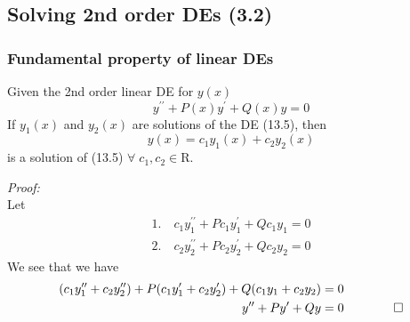 \documentclass{report}
\begin{document}
\subsection{Solving 2nd order DEs (3.2)}
\subsubsection{Fundamental property of linear DEs}
Given the 2nd order linear DE for $y(x)$
\begin{equation}
y^{\prime\prime} + P(x)y^\prime + Q(x)y = 0
\end{equation}
If $y_1(x)$ and $y_2(x)$ are solutions of the DE (13.5), then
$$y(x) = c_1y_1(x) + c_2y_2(x)$$
is a solution of (13.5) $\forall \; c_1,c_2 \in \mathrm{R}$.

\vspace{0.5em}\noindent\textit{Proof:} \\
Let
\begin{align*}
1. \quad c_1y_1^{\prime\prime} + Pc_1y_1^\prime + Qc_1y_1 = 0 \\
2. \quad c_2y_2^{\prime\prime} + Pc_2y_2^\prime + Qc_2y_2 = 0
\end{align*}
We see that we have
\begin{align*}
(c_1y_1^{\prime\prime} + c_2y_2^{\prime\prime}) + P(c_1y_1^{\prime} + c_2y_2^{\prime}) + Q(c_1y_1 + c_2y_2) &= 0 \\
y^{\prime\prime} + Py^\prime + Qy &= 0 \qquad \qed
\end{align*}
\end{document}
